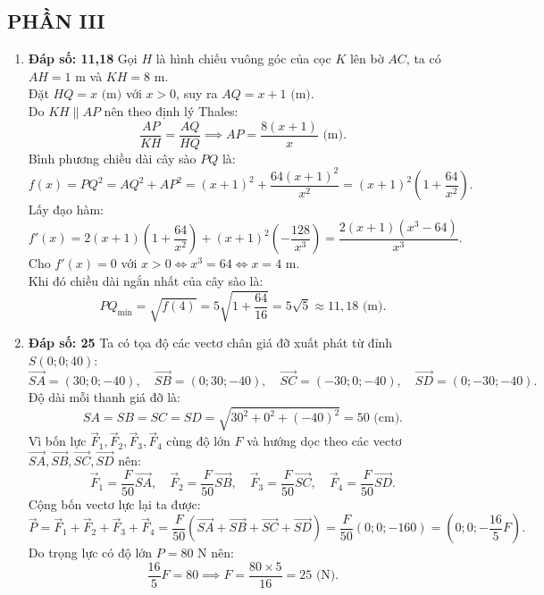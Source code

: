\documentclass[12pt,a4paper]{article}
\begin{document}
\subsection*{PHẦN III}
\begin{enumerate}[label=\textbf{Câu \arabic*:}, leftmargin=*]

\item \textbf{Đáp số: 11,18}
Gọi $H$ là hình chiếu vuông góc của cọc $K$ lên bờ $AC$, ta có $AH = 1\text{ m}$ và $KH = 8\text{ m}$.\\
Đặt $HQ = x\text{ (m)}$ với $x > 0$, suy ra $AQ = x + 1\text{ (m)}$.\\
Do $KH \parallel AP$ nên theo định lý Thales:
$$\dfrac{AP}{KH} = \dfrac{AQ}{HQ} \implies AP = \dfrac{8(x + 1)}{x}\text{ (m)}.$$
Bình phương chiều dài cây sào $PQ$ là:
$$f(x) = PQ^2 = AQ^2 + AP^2 = (x + 1)^2 + \dfrac{64(x + 1)^2}{x^2} = (x + 1)^2\left(1 + \dfrac{64}{x^2}\right).$$
Lấy đạo hàm:
$$f'(x) = 2(x + 1)\left(1 + \dfrac{64}{x^2}\right) + (x + 1)^2\left(-\dfrac{128}{x^3}\right) = \dfrac{2(x + 1)(x^3 - 64)}{x^3}.$$
Cho $f'(x) = 0$ với $x > 0 \iff x^3 = 64 \iff x = 4\text{ m}$.\\
Khi đó chiều dài ngắn nhất của cây sào là:
$$PQ_{\min} = \sqrt{f(4)} = 5\sqrt{1 + \dfrac{64}{16}} = 5\sqrt{5} \approx 11{,}18\text{ (m)}.$$

\item \textbf{Đáp số: 25}
Ta có tọa độ các vectơ chân giá đỡ xuất phát từ đỉnh $S(0; 0; 40)$:
$$\overrightarrow{SA} = (30; 0; -40), \quad \overrightarrow{SB} = (0; 30; -40), \quad \overrightarrow{SC} = (-30; 0; -40), \quad \overrightarrow{SD} = (0; -30; -40).$$
Độ dài mỗi thanh giá đỡ là:
$$SA = SB = SC = SD = \sqrt{30^2 + 0^2 + (-40)^2} = 50\text{ (cm)}.$$
Vì bốn lực $\vec{F}_1, \vec{F}_2, \vec{F}_3, \vec{F}_4$ cùng độ lớn $F$ và hướng dọc theo các vectơ $\overrightarrow{SA}, \overrightarrow{SB}, \overrightarrow{SC}, \overrightarrow{SD}$ nên:
$$\vec{F}_1 = \dfrac{F}{50}\overrightarrow{SA}, \quad \vec{F}_2 = \dfrac{F}{50}\overrightarrow{SB}, \quad \vec{F}_3 = \dfrac{F}{50}\overrightarrow{SC}, \quad \vec{F}_4 = \dfrac{F}{50}\overrightarrow{SD}.$$
Cộng bốn vectơ lực lại ta được:
$$\vec{P} = \vec{F}_1 + \vec{F}_2 + \vec{F}_3 + \vec{F}_4 = \dfrac{F}{50}\left(\overrightarrow{SA} + \overrightarrow{SB} + \overrightarrow{SC} + \overrightarrow{SD}\right) = \dfrac{F}{50}(0; 0; -160) = \left(0; 0; -\dfrac{16}{5}F\right).$$
Do trọng lực có độ lớn $P = 80\text{ N}$ nên:
$$\dfrac{16}{5}F = 80 \implies F = \dfrac{80 \times 5}{16} = 25\text{ (N)}.$$


\end{enumerate}
\end{document}
